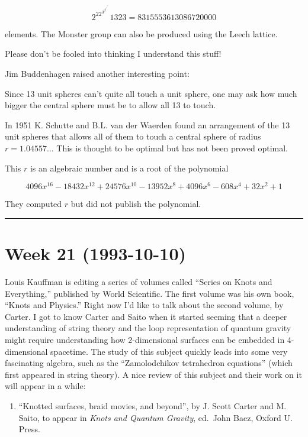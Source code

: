 \documentclass{article}
\def\tightlist{}
\begin{document}
\[2^22^ 3^9^ 5^4^ 7^2^ 11 13 23 = 8315553613086720000\]

elements. The Monster group can also be produced using the Leech
lattice.

Please don't be fooled into thinking I understand this stuff!

Jim Buddenhagen raised another interesting point:

Since 13 unit spheres can't quite all touch a unit sphere, one may ask
how much bigger the central sphere must be to allow all 13 to touch.

In 1951 K. Schutte and B.L. van der Waerden found an arrangement of the
13 unit spheres that allows all of them to touch a central sphere of
radius \(r=1.04557\ldots\) This is thought to be optimal but has not
been proved optimal.

This \(r\) is an algebraic number and is a root of the polynomial

\[4096 x^{16} - 18432 x^{12} + 24576 x^{10} - 13952 x^8 + 4096 x^6 - 608x^4 + 32 x^2 + 1\]

They computed \(r\) but did not publish the polynomial.

\begin{center}\rule{0.5\linewidth}{0.5pt}\end{center}
\hypertarget{week-21-1993-10-10}{%
\section{Week 21 (1993-10-10)}\label{week-21-1993-10-10}}

Louis Kauffman is editing a series of volumes called ``Series on Knots
and Everything,'' published by World Scientific. The first volume was
his own book, ``Knots and Physics.'' Right now I'd like to talk about
the second volume, by Carter. I got to know Carter and Saito when it
started seeming that a deeper understanding of string theory and the
loop representation of quantum gravity might require understanding how
2-dimensional surfaces can be embedded in 4-dimensional spacetime. The
study of this subject quickly leads into some very fascinating algebra,
such as the ``Zamolodchikov tetrahedron equations'' (which first
appeared in string theory). A nice review of this subject and their work
on it will appear in a while:

\begin{enumerate}
\def\labelenumi{\arabic{enumi})}
\tightlist
\item
  ``Knotted surfaces, braid movies, and beyond'', by J. Scott Carter and
  M. Saito, to appear in \emph{Knots and Quantum Gravity}, ed.~John
  Baez, Oxford U. Press.
\end{enumerate}
\end{document}

